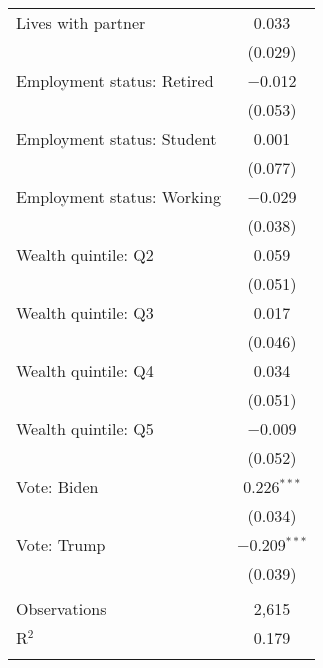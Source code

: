 \begin{tabular}{@{\extracolsep{5pt}}lc}
  Lives with partner & 0.033 \\ 
  & (0.029) \\ 
  Employment status: Retired & $-$0.012 \\ 
  & (0.053) \\ 
  Employment status: Student & 0.001 \\ 
  & (0.077) \\ 
  Employment status: Working & $-$0.029 \\ 
  & (0.038) \\ 
  Wealth quintile: Q2 & 0.059 \\ 
  & (0.051) \\ 
  Wealth quintile: Q3 & 0.017 \\ 
  & (0.046) \\ 
  Wealth quintile: Q4 & 0.034 \\ 
  & (0.051) \\ 
  Wealth quintile: Q5 & $-$0.009 \\ 
  & (0.052) \\ 
  Vote: Biden & 0.226$^{***}$ \\ 
  & (0.034) \\ 
  Vote: Trump & $-$0.209$^{***}$ \\ 
  & (0.039) \\ 
 \hline \\[-1.8ex] 

Observations & 2,615 \\ 
R$^{2}$ & 0.179 \\ 
\hline 
\hline \\[-1.8ex] 
\end{tabular} 